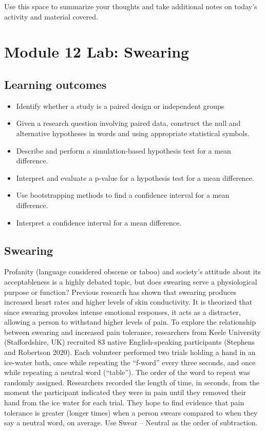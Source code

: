 \documentclass[
]{report}
\begin{document}
Use this space to summarize your thoughts and take additional notes on today's activity and material covered.

\newpage

\hypertarget{module-12-lab-swearing}{%
\section{Module 12 Lab: Swearing}\label{module-12-lab-swearing}}


\hypertarget{learning-outcomes-24}{%
\subsection{Learning outcomes}\label{learning-outcomes-24}}

\begin{itemize}
\item
  Identify whether a study is a paired design or independent groups
\item
  Given a research question involving paired data, construct the null and alternative hypotheses
  in words and using appropriate statistical symbols.
\item
  Describe and perform a simulation-based hypothesis test for a mean difference.
\item
  Interpret and evaluate a p-value for a hypothesis test for a mean difference.
\item
  Use bootstrapping methods to find a confidence interval for a mean difference.
\item
  Interpret a confidence interval for a mean difference.
\end{itemize}

\hypertarget{swearing}{%
\subsection{Swearing}\label{swearing}}

Profanity (language considered obscene or taboo) and society's attitude about its acceptableness is a highly debated topic, but does swearing serve a physiological purpose or function? Previous research has shown that swearing produces increased heart rates and higher levels of skin conductivity. It is theorized that since swearing provokes intense emotional responses, it acts as a distracter, allowing a person to withstand higher levels of pain. To explore the relationship between swearing and increased pain tolerance, researchers from Keele University (Staffordshire, UK) recruited 83 native English-speaking participants (Stephens and Robertson 2020). Each volunteer performed two trials holding a hand in an ice-water bath, once while repeating the ``f-word'' every three seconds, and once while repeating a neutral word (``table''). The order of the word to repeat was randomly assigned. Researchers recorded the length of time, in seconds, from the moment the participant indicated they were in pain until they removed their hand from the ice water for each trial. They hope to find evidence that pain tolerance is greater (longer times) when a person swears compared to when they say a neutral word, on average. Use Swear -- Neutral as the order of subtraction.
\end{document}
